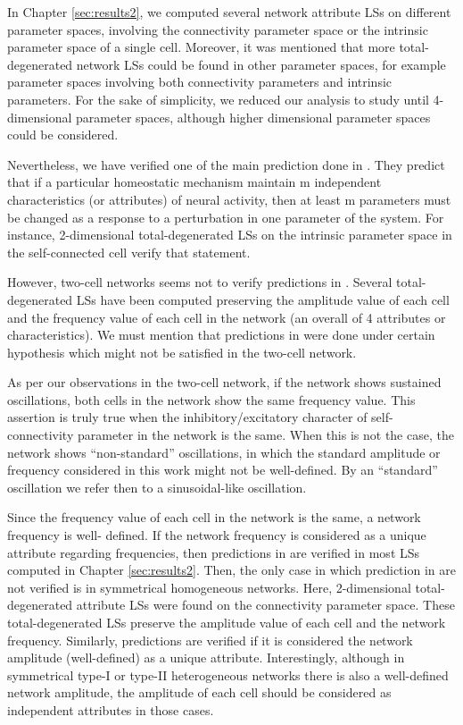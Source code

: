 In Chapter \ref{sec:results2}, we computed several network attribute LSs on different parameter spaces, involving the connectivity parameter space or the intrinsic parameter space of a single cell. Moreover, it was mentioned that more total-degenerated network LSs could be found in other parameter spaces, for example parameter spaces involving both connectivity parameters and intrinsic parameters. For the sake of simplicity, we reduced our analysis to study until 4-dimensional parameter spaces, although higher dimensional parameter spaces could be considered. 

Nevertheless, we have verified one of the main prediction done in  \cite{Oly}. They predict that if a particular homeostatic mechanism maintain m independent characteristics (or attributes) of neural activity, then at least m parameters must be changed as a response to a perturbation in one parameter of the system. For instance, 2-dimensional total-degenerated LSs on the intrinsic parameter space in the self-connected cell verify that statement. 

However, two-cell networks seems not to verify predictions in  \cite{Oly}. Several total-degenerated LSs have been computed preserving the amplitude value of each cell and the frequency value of each cell in the network (an overall of 4 attributes or characteristics). We must mention that predictions in  \cite{Oly} were done under certain hypothesis which might not be satisfied in the two-cell network. 

As per our observations in the two-cell network, if the network shows sustained oscillations, both cells in the network show the same frequency value. This assertion is truly true when the inhibitory/excitatory character of self-connectivity parameter in the network is the same. When this is not the case, the network shows “non-standard” oscillations, in which the standard amplitude or frequency considered in this work might not be well-defined. By an “standard” oscillation we refer then to a sinusoidal-like oscillation. 

Since the frequency value of each cell in the network is the same, a network frequency is well- defined. If the network frequency is considered as a unique attribute regarding frequencies, then predictions in  \cite{Oly} are verified in most LSs computed in Chapter \ref{sec:results2}. Then, the only case in which prediction in  \cite{Oly} are not verified is in symmetrical homogeneous networks. Here, 2-dimensional total-degenerated attribute LSs were found on the connectivity parameter space. These total-degenerated LSs preserve the amplitude value of each cell and the network frequency. Similarly, predictions are verified if it is considered the network amplitude (well-defined) as a unique attribute. Interestingly, although in symmetrical type-I or type-II heterogeneous networks there is also a well-defined network amplitude, the amplitude of each cell should be considered as independent attributes in those cases.

